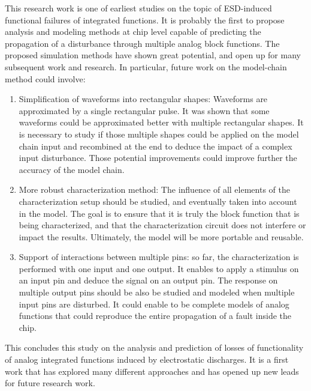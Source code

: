 This research work is one of earliest studies on the topic of ESD-induced functional failures of integrated functions.
It is probably the first to propose analysis and modeling methods at chip level capable of predicting the propagation of a disturbance through multiple analog block functions.
The proposed simulation methods have shown great potential, and open up for many subsequent work and research.
In particular, future work on the model-chain method could involve:

\begin{enumerate}
  \item Simplification of waveforms into rectangular shapes: Waveforms are approximated by a single rectangular pulse.
  It was shown that some waveforms could be approximated better with multiple rectangular shapes.
  It is necessary to study if those multiple shapes could be applied on the model chain input and recombined at the end to deduce the impact of a complex input disturbance.
  Those potential improvements could improve further the accuracy of the model chain.
  \item More robust characterization method: The influence of all elements of the characterization setup should be studied, and eventually taken into account in the model. The goal is to ensure that it is truly the block function that is being characterized, and that the characterization circuit does not interfere or impact the results. Ultimately, the model will be more portable and reusable.
  \item Support of interactions between multiple pins: so far, the characterization is performed with one input and one output.
  It enables to apply a stimulus on an input pin and deduce the signal on an output pin.
  The response on multiple output pins should be also be studied and modeled when multiple input pins are disturbed.
  It could enable to be complete models of analog functions that could reproduce the entire propagation of a fault inside the chip.
\end{enumerate}

This concludes this study on the analysis and prediction of losses of functionality of analog integrated functions induced by electrostatic discharges.
It is a first work that has explored many different approaches and has opened up new leads for future research work.
